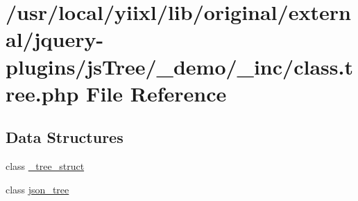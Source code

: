 \hypertarget{class_8tree_8php}{
\section{/usr/local/yiixl/lib/original/external/jquery-\/plugins/jsTree/\_\-demo/\_\-inc/class.tree.php File Reference}
\label{class_8tree_8php}
}
\subsection*{Data Structures}
\begin{DoxyCompactItemize}
\item 
class \hyperlink{class__tree__struct}{\_\-tree\_\-struct}
\item 
class \hyperlink{classjson__tree}{json\_\-tree}
\end{DoxyCompactItemize}
